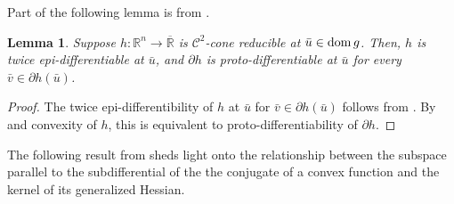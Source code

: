\documentclass[reqno]{amsart}
\newtheorem{lemma}[proposition]{Lemma}
\numberwithin{equation}{section}
\newcommand{\R}{\mathbb{R}}
\newcommand{\X}{\mathbb{X}}
\newcommand{\x}{\bar{x}}
\newcommand{\para}{\mathrm{par}\,}
\begin{document}
\noindent
 Part of the following lemma is from \cite[Proposition~3.1]{TW24}. 
\begin{lemma}\label{lem:protodiff}
    Suppose $h: \R^n \to \overline{\R}$ is $\mathcal{C}^2$-cone reducible at $\bar {u}\in {\rm dom}\, g$. Then, $h$ is twice epi-differentiable at $\bar u$, and $\partial h$ is proto-differentiable at  $\bar{u}$ for every $\bar v \in \partial h(\bar{u})$.
\end{lemma}

\begin{proof}
The twice epi-differentibility of $h$ at $\bar u$ for $\bar v\in \partial h(\bar u)$ follows from \cite[Proposition~3.1]{TW24}. By \cite[Theorem 2.2]{R 90} and convexity of $h$, this is equivalent to proto-differentiability of $\partial h$.
\end{proof}

The following result from  sheds light onto the relationship between the subspace parallel to the subdifferential of the the conjugate of a convex function and the kernel of its generalized Hessian.

\end{document}

